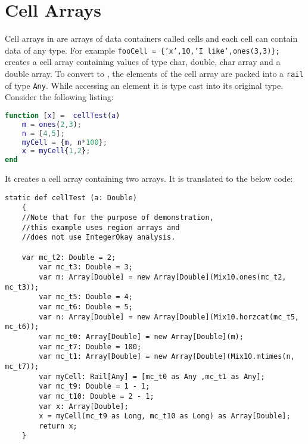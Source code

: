 \section{Cell Arrays}

Cell arrays in \matlab are arrays of data containers called cells and
each cell can contain data of any type. For example \texttt{fooCell =
\{'x',10,'I like',ones(3,3)\};} creates a cell array containing values
of type char, double, char array and a double array. To convert to
\xten, the elements of the cell array are packed into a \texttt{rail} of
type \verb|Any|. While accessing an element it is type cast into its
original type.  Consider the following \matlab listing:
  
\begin{lstlisting}[language=Matlab,numbers=none]
function [x] =  cellTest(a)
	m = ones(2,3);
	n = [4,5];
	myCell = {m, n*100};
	x = myCell{1,2};
end
\end{lstlisting}

It creates a cell array containing two arrays. It is translated to the below
\xten code:

\begin{lstlisting}[language=X10,numbers=none]
static def cellTest (a: Double)
	{ 
    //Note that for the purpose of demonstration,
    //this example uses region arrays and
    //does not use IntegerOkay analysis.
		
    var mc_t2: Double = 2;
		var mc_t3: Double = 3;
		var m: Array[Double] = new Array[Double](Mix10.ones(mc_t2, mc_t3));
		var mc_t5: Double = 4;
		var mc_t6: Double = 5;
		var n: Array[Double] = new Array[Double](Mix10.horzcat(mc_t5, mc_t6));
		var mc_t0: Array[Double] = new Array[Double](m);
		var mc_t7: Double = 100;
		var mc_t1: Array[Double] = new Array[Double](Mix10.mtimes(n, mc_t7));
		var myCell: Rail[Any] = [mc_t0 as Any ,mc_t1 as Any];
		var mc_t9: Double = 1 - 1;
		var mc_t10: Double = 2 - 1;
		var x: Array[Double];
		x = myCell(mc_t9 as Long, mc_t10 as Long) as Array[Double];
		return x;
	}
\end{lstlisting}
